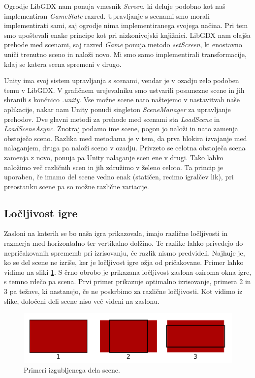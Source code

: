\documentclass[12pt,a4paper,twoside]{book}
\begin{document}
Ogrodje LibGDX nam ponuja vmesnik \textit{Screen}, ki deluje podobno kot naš implementiran \textit{GameState} razred. Upravljanje s scenami smo morali implementirati sami, saj ogrodje nima implementiranega svojega načina. Pri tem smo upoštevali enake principe kot pri nizkonivojski knjižnici. LibGDX nam olajša prehode med scenami, saj razred \textit{Game} ponuja metodo \textit{setScreen}, ki enostavno uniči trenutno sceno in naloži novo. Mi smo samo implementirali transformacije, kdaj se katera scena spremeni v drugo.

Unity ima svoj sistem upravljanja s scenami, vendar je v ozadju zelo podoben temu v LibGDX. V grafičnem urejevalniku smo ustvarili posamezne scene in jih shranili s končnico \textit{.unity}. Vse možne scene nato naštejemo v nastavitvah naše aplikacije, nakar nam Unity ponudi singleton \textit{SceneManager} za upravljanje prehodov. Dve glavni metodi za prehode med scenami sta \textit{LoadScene} in \textit{LoadSceneAsync}. Znotraj podamo ime scene, pogon jo naloži in nato zamenja obstoječo sceno. Razlika med metodama je v tem, da prva blokira izvajanje med nalaganjem, druga pa naloži sceno v ozadju. Privzeto se celotna obstoječa scena zamenja z novo, ponuja pa Unity nalaganje scen ene v drugi. Tako lahko naložimo več različnih scen in jih združimo v želeno celoto. Ta princip je uporaben, če imamo del scene vedno enak (statičen, recimo igralčev lik), pri preostanku scene pa so možne različne variacije.

\subsection{Ločljivost igre}
Zasloni na katerih se bo naša igra prikazovala, imajo različne ločljivosti in razmerja med horizontalno ter vertikalno dolžino. Te razlike lahko privedejo do nepričakovanih sprememb pri izrisovanju, če razlik nismo predvideli. Najhuje je, ko se del scene ne izriše, ker je ločljivost igre ožja od pričakovane. Primer lahko vidimo na sliki \ref{slika:rezanje}. S črno obrobo je prikazana ločljivost zaslona oziroma okna igre, s temno rdečo pa scena. Prvi primer prikazuje optimalno izrisovanje, primera 2 in 3 pa težave, ki nastanejo, če ne poskrbimo za različne ločljivosti. Kot vidimo iz slike, določeni deli scene niso več videni na zaslonu.

\begin{figure}[h]
	\centering
	\includegraphics[width=12cm]{rezanjeResolucije}
	\caption{Primeri izgubljenega dela scene.}
	\label{slika:rezanje}
\end{figure}
\end{document}
